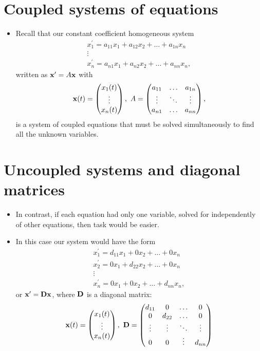 \documentclass[11pt,a4paper]{article}
\begin{document}
	\section*{Coupled systems of equations}
	\begin{itemize}
		\item Recall that our constant coefficient homogeneous system
		$$
		\begin{matrix}
			x_1^\prime = a_{11}x_1 + a_{12}x_2 + \ldots + a_{1n}x_n\\
			\vdots\\
			x_n^\prime = a_{n1}x_1 + a_{n2}x_2 + \ldots + a_{nn}x_n,
		\end{matrix}
		$$
		written as $\vb{x}^\prime = A\vb{x}$ with
		$$
		\vb{x}(t) = 
		\begin{pmatrix}
			x_1(t)\\
			\vdots\\
			x_n(t)
		\end{pmatrix},\ A =
		\begin{pmatrix}
			a_{11} & \ldots & a_{1n}\\
			\vdots & \ddots & \vdots\\
			a_{n1} & \ldots & a_{nn}
		\end{pmatrix},
		$$
		is a system of coupled equations that must be solved simultaneously to find all the unknown variables. 
	\end{itemize}
	\section*{Uncoupled systems and diagonal matrices}
	\begin{itemize}
		\item In contrast, if each equation had only one variable, solved for independently of other equations, then task would be easier.
		\item In this case our system would have the form
		$$
		\begin{matrix}
			x_1^\prime = d_{11} x_1 + 0x_2 +\ldots + 0x_n\\
			x_2^\prime = 0 x_1 + d_{22}x_2 +\ldots + 0x_n\\
			\vdots\\
			x_n^\prime = 0 x_1 + 0x_2 +\ldots + d_{nn}x_n,
		\end{matrix}
		$$
		or $\vb{x}^\prime = \vb{D}\vb{x}$, where $\vb{D}$ is a diagonal matrix:
		$$
		\vb{x}(t) =
		\begin{pmatrix}
			x_1(t)\\
			\vdots\\
			x_n(t)
		\end{pmatrix},\ \vb{D} =
		\begin{pmatrix}
			d_{11} & 0 & \ldots & 0\\
			0 & d_{22} & \ldots & 0\\
			\vdots & \vdots & \ddots & \vdots\\
			0 & 0 & \vdots & d_{nn}
		\end{pmatrix}
		$$ 
	\end{itemize}
\end{document}
